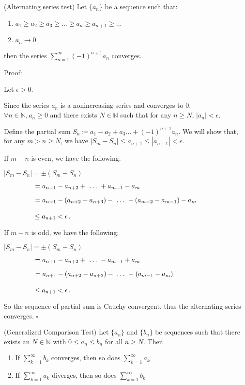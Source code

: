 \documentclass{article}
\begin{document}
(Alternating series test) Let $\{a_n\}$ be a sequence such that:

\begin{enumerate}

\item $a_1 \geq a_2 \geq a_3 \geq \dots \geq a_n \geq a_{n+1} \geq \dots$

\item $a_n \to 0$

\end{enumerate}

then the series $\sum_{n=1}^\infty(-1)^{n+1}a_n$ converges. 

Proof:

Let $\epsilon > 0$.

Since the series $a_n$ is a nonincreasing series and converges to $0$, \\$\forall n \in \mathbb{N}, a_n \geq 0$ and there exists $N \in \mathbb{N}$ such that for any $n \geq N$, $|a_n| < \epsilon$.

Define the partial sum $S_n \coloneqq a_1 - a_2 +a_3 \dots +(-1)^{n+1}a_n$. We will show that, for any $m > n \geq N$, we have $|S_m - S_n| \le a_{n+1} \le |a_{n+1}| <\epsilon$.

If $m-n$ is even, we have the following: 

$|S_m - S_n| = \pm (S_m - S_n)  $

$\hspace{1.6cm}= a_{n+1} - a_{n+2} + ~\dots ~+a_{m-1} -a_m$

$\hspace{1.6cm}=a_{n+1} - (a_{n+2} -a_{n+3}) -~ \dots~ -(a_{m-2} - a_{m-1}) -a_m $

$\hspace{1.6cm} \le a_{n+1} < \epsilon$.

If $m-n$ is odd, we have the following:

$|S_m - S_n| = \pm (S_m -S_n)$

$\hspace{1.6cm}= a_{n+1} - a_{n+2} +~ \dots~ -a_{m-1} +a_m$

$\hspace{1.6cm}= a_{n+1} - (a_{n+2} -a_{n+3}) -~ \dots~  - (a_{m-1} -a_m) $

$\hspace{1.6cm}\le a_{n+1} < \epsilon$.

So the sequence of partial sum is Cauchy convergent, thus the alternating series converges. $\square$

(Generalized Comparison Test) Let $\{a_n\}$ and $\{b_n\}$ be sequences such that there exists an $N\in\mathbb{N}$ with $0\leq a_n\leq b_n$ for all $n\geq N$.  Then
\begin{enumerate}

\item If $\sum_{k=1}^\infty b_k$ converges, then so does $\sum_{k=1}^\infty a_k$
\item If $\sum_{k=1}^\infty a_k$ diverges, then so does $\sum_{k=1}^\infty b_k$
\end{enumerate}
\end{document}

